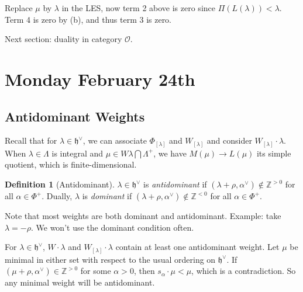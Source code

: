 \documentclass[11pt]{scrartcl}
\theoremstyle{definition}
\theoremstyle{theorem}
\theoremstyle{proof}
\newenvironment{proof}
{\pushQED{$\qed$}\pf}
{\par\popQED\endpf}
\theoremstyle{definition}
\newtheorem{definition}{Definition}[theorem]
\theoremstyle{break}
\theoremstyle{problem}
\providecommand{\tightlist}{%
  \setlength{\itemsep}{0pt}\setlength{\parskip}{0pt}}
\newcommand{\ZZ}[0]{{\mathbb{Z}}}
\newcommand{\dual}[0]{^\vee}
\newcommand{\intersect}[0]{\bigcap}
\newcommand{\lieh}[0]{{\mathfrak{h}}}
\newcommand{\OO}[0]{{\mathcal{O}}}
\renewcommand{\qed}[0]{\hfill\blacksquare}
\renewcommand{\to}[0]{\longrightarrow}
\begin{document}
\begin{proof}[of (d)]

Replace \(\mu\) by \(\lambda\) in the LES, now term 2 above is zero
since \(\Pi(L(\lambda)) < \lambda\). Term 4 is zero by (b), and thus
term 3 is zero.\end{proof}

Next section: duality in category \(\OO\).

\hypertarget{monday-february-24th}{%
\section{Monday February 24th}\label{monday-february-24th}}

\hypertarget{antidominant-weights}{%
\subsection{Antidominant Weights}\label{antidominant-weights}}

Recall that for \(\lambda \in \lieh\dual\), we can associate
\(\Phi_{[\lambda]}\) and \(W_{[\lambda]}\) and consider
\(W_{[\lambda]} \cdot \lambda\). When \(\lambda \in \Lambda\) is
integral and \(\mu \in W\lambda \intersect \Lambda^+\), we have
\(M(\mu) \to L(\mu)\) its simple quotient, which is finite-dimensional.

\begin{definition}[Antidominant]

\(\lambda \in \lieh\dual\) is \emph{antidominant} if
\((\lambda + \rho, \alpha\dual) \not\in \ZZ^{> 0}\) for all
\(\alpha \in \Phi^+\). Dually, \(\lambda\) is \emph{dominant} if
\((\lambda + \rho, \alpha\dual)\not\in\ZZ^{<0}\) for all
\(\alpha\in\Phi^+\).\end{definition}

Note that most weights are both dominant and antidominant. Example: take
\(\lambda = -\rho\). We won't use the dominant condition often.

\begin{description}
\tightlist
\item[Remark]
For \(\lambda \in \lieh\dual\), \(W\cdot \lambda\) and
\(W_{[\lambda]}\cdot \lambda\) contain at least one antidominant weight.
Let \(\mu\) be minimal in either set with respect to the usual ordering
on \(\lieh\dual\). If \((\mu + \rho, \alpha\dual) \in \ZZ^{>0}\) for
some \(\alpha > 0\), then \(s_\alpha \cdot \mu < \mu\), which is a
contradiction. So any minimal weight will be antidominant.
\end{description}
\end{document}
